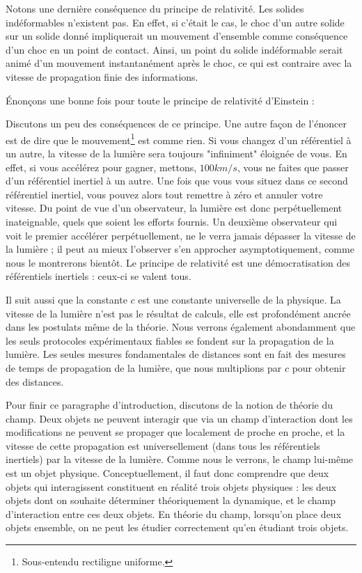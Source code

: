 		Notons une dernière conséquence du principe de relativité. Les solides indéformables n'existent pas. En effet, si c'était le cas, le choc d'un autre solide sur un solide donné impliquerait un mouvement d'ensemble comme conséquence d'un choc en un point de contact. Ainsi, un point du solide indéformable serait animé d'un mouvement instantanément après le choc, ce qui est contraire avec la vitesse de propagation finie des informations.

		Énonçons une bonne fois pour toute le principe de relativité d'Einstein :

		\hspace{-0.5cm}

		Discutons un peu des conséquences de ce principe. Une autre façon de l'énoncer est de dire que le mouvement\footnote{Sous-entendu rectiligne uniforme.} est comme rien. Si vous changez d'un référentiel à un autre, la vitesse de la lumière sera toujours "infiniment" éloignée de vous. En effet, si vous accélérez pour gagner, mettons, $100km/s$, vous ne faites que passer d'un référentiel inertiel à un autre. Une fois que vous vous situez dans ce second référentiel inertiel, vous pouvez alors tout remettre à zéro et annuler votre vitesse. Du point de vue d'un observateur, la lumière est donc perpétuellement inateignable, quels que soient les efforts fournis. Un deuxième observateur qui voit le premier accélérer perpétuellement, ne le verra jamais dépasser la vitesse de la lumière ; il peut au mieux l'observer s'en approcher asymptotiquement, comme nous le montrerons bientôt. Le principe de relativité est une démocratisation des référentiels inertiels : ceux-ci se valent tous.

		Il suit aussi que la constante $c$ est une constante universelle de la physique. La vitesse de la lumière n'est pas le résultat de calculs, elle est profondément ancrée dans les postulats même de la théorie. Nous verrons également abondamment que les seuls protocoles expérimentaux fiables se fondent sur la propagation de la lumière. Les seules mesures fondamentales de distances sont en fait des mesures de temps de propagation de la lumière, que nous multiplions par $c$ pour obtenir des distances.

		Pour finir ce paragraphe d'introduction, discutons de la notion de théorie du champ. Deux objets ne peuvent interagir que via un champ d'interaction dont les modifications ne peuvent se propager que localement de proche en proche, et la vitesse de cette propagation est universellement (dans tous les référentiels inertiels) par la vitesse de la lumière. Comme nous le verrons, le champ lui-même est un objet physique. Conceptuellement, il faut donc comprendre que deux objets qui interagissent constituent en réalité trois objets physiques : les deux objets dont on souhaite déterminer théoriquement la dynamique, et le champ d'interaction entre ces deux objets. En théorie du champ, lorsqu'on place deux objets ensemble, on ne peut les étudier correctement qu'en étudiant trois objets.

